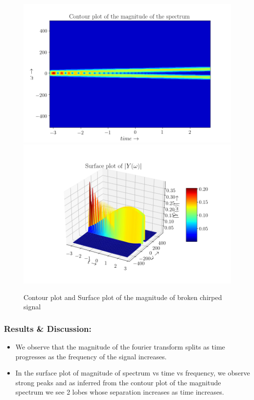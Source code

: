\documentclass[11pt, a4paper]{article}
\begin{document}
\begin{figure}[!tbh]
  \centering
  \includegraphics[scale=0.6]{./../Extras/fig10-12.png}  %
  \includegraphics[scale=0.6]{./../Extras/fig10-13.png}  %
  \caption{Contour plot and Surface plot of the magnitude of broken chirped signal}
\end{figure}
\newpage
\subsubsection{Results \& Discussion:}\label{results-discussion}

\begin{itemize}
  \item
  We observe that the magnitude of the fourier transform splits as time
  progresses as the frequency of the signal increases.
\item
  In the surface plot of magnitude of spectrum vs time vs frequency, we observe strong peaks and as inferred from the contour plot of
  the magnitude spectrum we see 2 lobes whose separation increases as
  time increases.
\end{itemize}
\end{document}
